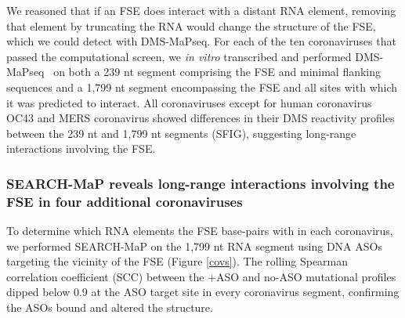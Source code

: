 \documentclass[main.tex]{subfiles}
\begin{document}
We reasoned that if an FSE does interact with a distant RNA element, removing that element by truncating the RNA would change the structure of the FSE, which we could detect with DMS-MaPseq.
For each of the ten coronaviruses that passed the computational screen, we \textit{in vitro} transcribed and performed DMS-MaPseq~\cite{Zubradt2016} on both a 239 nt segment comprising the FSE and minimal flanking sequences and a 1,799 nt segment encompassing the FSE and all sites with which it was predicted to interact.
All coronaviruses except for human coronavirus OC43 and MERS coronavirus showed differences in their DMS reactivity profiles between the 239 nt and 1,799 nt segments (SFIG), suggesting long-range interactions involving the FSE.

\subsubsection{SEARCH-MaP reveals long-range interactions involving the FSE in four additional coronaviruses}

To determine which RNA elements the FSE base-pairs with in each coronavirus, we performed SEARCH-MaP on the 1,799 nt RNA segment using DNA ASOs targeting the vicinity of the FSE (Figure \ref{covs}).
The rolling Spearman correlation coefficient (SCC) between the +ASO and no-ASO mutational profiles dipped below 0.9 at the ASO target site in every coronavirus segment, confirming the ASOs bound and altered the structure.
\end{document}

